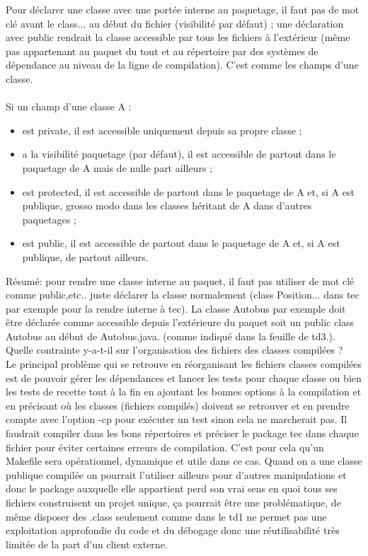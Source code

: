 \documentclass{article}
\begin{document}
Pour déclarer une classe avec une portée interne au paquetage, il faut pas de mot clé avant le class{...} au début du fichier (visibilité par défaut) ; une déclaration avec public rendrait la classe accessible par tous les fichiers à l'extérieur (même pas appartenant au paquet du tout et au répertoire par des systèmes de dépendance au niveau de la ligne de compilation).
C’est comme les champs d’une classe.
\\ \\
Si un champ d'une classe A :
\begin{itemize}
\item est private, il est accessible uniquement depuis sa propre classe ;
\item a la visibilité paquetage (par défaut), il est accessible de partout dans le paquetage de A mais de nulle part ailleurs ;
\item est protected, il est accessible de partout dans le paquetage de A et, si A est publique, grosso modo dans les classes héritant de A dans d'autres paquetages ;
\item est public, il est accessible de partout dans le paquetage de A et, si A est publique, de partout ailleurs.
\end{itemize}
Résumé: pour rendre une classe interne au paquet, il faut pas utiliser de mot clé comme public,etc.. juste déclarer la classe normalement (class Position{...} dans tec par exemple pour la rendre interne à tec). La classe Autobus par exemple doit être déclarée comme accessible depuis l'extérieure du paquet soit un public class Autobus au début de
Autobus.java. (comme indiqué dans la feuille de td3.).\\
\newline
\newline
Quelle contrainte y-a-t-il sur l’organisation des fichiers des
classes compilées ?\\
Le principal problème qui se retrouve en réorganisant les fichiers classes compilées est de pouvoir gérer les dépendances et lancer les tests pour chaque classe ou bien les tests de recette tout à la fin en ajoutant les bonnes options à la compilation et en précisant où les classes (fichiers compilés) doivent se retrouver et en prendre compte avec l’option -cp pour exécuter un test sinon cela ne marcherait pas. Il faudrait compiler dans les bons répertoires et préciser le package tec dans chaque fichier pour éviter certaines erreurs de compilation. C’est pour cela qu’un Makefile sera opérationnel, dynamique et utile dans ce cas. Quand on a une classe publique compilée on pourrait l’utiliser ailleurs pour d’autres manipulations et donc le package auxquelle elle appartient perd son vrai sens en quoi tous ses fichiers construisent un projet unique, ça pourrait être une problématique, de même disposer des .class seulement comme dans le td1 ne permet pas une exploitation approfondie du code et du débogage donc une réutilisabilité très limitée de la part d’un client externe.\\ \\ \\
\end{document}
